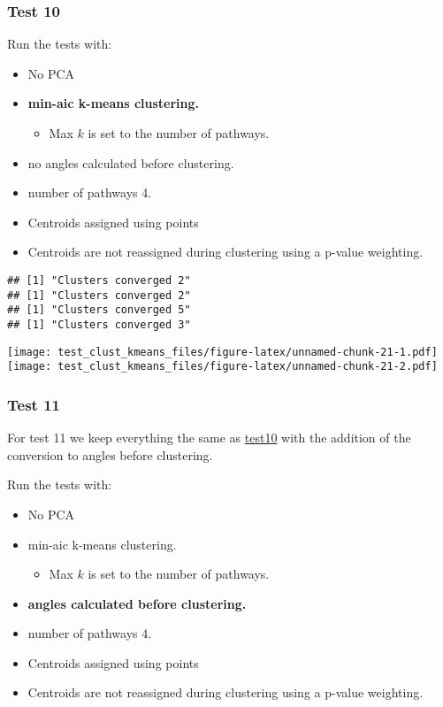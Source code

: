 \documentclass[
]{article}
\providecommand{\tightlist}{%
  \setlength{\itemsep}{0pt}\setlength{\parskip}{0pt}}
\begin{document}
\hypertarget{test10}{%
\subsubsection{Test 10}\label{test10}}

Run the tests with:

\begin{itemize}
\tightlist
\item
  No PCA
\item
  \textbf{min-aic k-means clustering.}

  \begin{itemize}
  \tightlist
  \item
    Max \(k\) is set to the number of pathways.
  \end{itemize}
\item
  no angles calculated before clustering.
\item
  number of pathways 4.
\item
  Centroids assigned using points
\item
  Centroids are not reassigned during clustering using a p-value
  weighting.
\end{itemize}

\begin{verbatim}
## [1] "Clusters converged 2"
## [1] "Clusters converged 2"
## [1] "Clusters converged 5"
## [1] "Clusters converged 3"
\end{verbatim}

\texttt{[image: test\_clust\_kmeans\_files/figure-latex/unnamed-chunk-21-1.pdf]}
\texttt{[image: test\_clust\_kmeans\_files/figure-latex/unnamed-chunk-21-2.pdf]}

\hypertarget{test11}{%
\subsubsection{Test 11}\label{test11}}

For test 11 we keep everything the same as
\protect\hyperlink{test10}{test10} with the addition of the conversion
to angles before clustering.

Run the tests with:

\begin{itemize}
\tightlist
\item
  No PCA
\item
  min-aic k-means clustering.

  \begin{itemize}
  \tightlist
  \item
    Max \(k\) is set to the number of pathways.
  \end{itemize}
\item
  \textbf{angles calculated before clustering.}
\item
  number of pathways 4.
\item
  Centroids assigned using points
\item
  Centroids are not reassigned during clustering using a p-value
  weighting.
\end{itemize}
\end{document}
